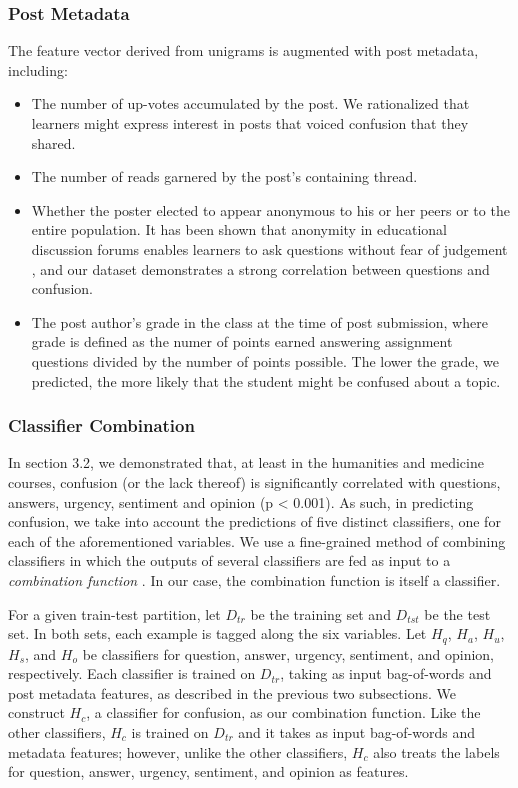 \documentclass{edm_template}
\begin{document}
\subsubsection{Post Metadata}
The feature vector derived from unigrams is augmented with post metadata, including: 
\vspace{-15pt}
\begin{itemize}
       \item The number of up-votes accumulated by the post. We rationalized that learners might express interest in posts that voiced confusion that they shared. 
       \item The number of reads garnered by the post's containing thread.
       \item Whether the poster elected to appear anonymous to his or her peers or to the entire population. It has been shown that anonymity in educational discussion forums enables learners to ask questions without fear of judgement \cite{freeman2004student}, and our dataset demonstrates a strong correlation between questions and confusion.
       \item The post author's grade in the class at the time of post submission, where grade is defined as the numer of points earned answering assignment questions divided by the number of points possible. The lower the grade, we predicted, the more likely that the student might be confused about a topic.
\end{itemize}

\subsubsection{Classifier Combination}
In section 3.2, we demonstrated that, at least in the humanities and medicine courses, confusion (or the lack thereof) is significantly correlated with questions, answers, urgency, sentiment and opinion (p < 0.001). As such, in predicting confusion, we take into account the predictions of five distinct classifiers, one for each of the aforementioned variables. We use a fine-grained method of combining classifiers in which the outputs of several classifiers are fed as input to a \emph{combination function} \cite{bennett2005combination}. In our case, the combination function is itself a classifier.

For a given train-test partition, let $D_{tr}$ be the training set and $D_{tst}$ be the test set. In both sets, each example is tagged along the six variables. Let $H_{q}$, $H_{a}$, $H_{u}$, $H_{s}$, and $H_{o}$ be classifiers for question, answer, urgency, sentiment, and opinion, respectively. Each classifier is trained on $D_{tr}$, taking as input bag-of-words and post metadata features, as described in the previous two subsections. We construct $H_{c}$, a classifier for confusion, as our combination function. Like the other classifiers, $H_{c}$ is trained on $D_{tr}$ and it takes as input bag-of-words and metadata features; however, unlike the other classifiers, $H_{c}$ also treats the labels for question, answer, urgency, sentiment, and opinion as features. 
\end{document}
